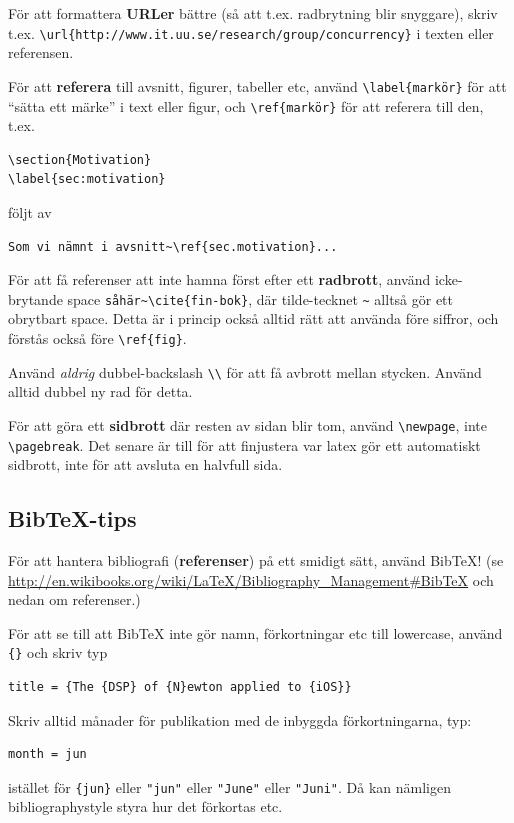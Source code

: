 \documentclass[a4paper,12pt]{article}
\begin{document}
För att formattera \textbf{URLer} bättre (så att t.ex. radbrytning blir snyggare), skriv t.ex. \verb|\url{http://www.it.uu.se/research/group/concurrency}| i texten eller referensen.

För att \textbf{referera} till avsnitt, figurer, tabeller etc, använd \verb|\label{markör}| för att ``sätta ett märke'' i text eller figur, och \verb|\ref{markör}| för att referera till den, t.ex.
\begin{verbatim}
\section{Motivation}
\label{sec:motivation}
\end{verbatim}

följt av
\begin{verbatim}
Som vi nämnt i avsnitt~\ref{sec.motivation}...
\end{verbatim}

För att få referenser att inte hamna först efter ett \textbf{radbrott}, använd icke-brytande space \verb|såhär~\cite{fin-bok}|, där tilde-tecknet \verb|~| alltså gör ett obrytbart space. Detta är i princip också alltid rätt att använda före siffror, och förstås också före \verb|\ref{fig}|.

Använd \emph{aldrig} dubbel-backslash \verb|\\| för att få avbrott mellan stycken. Använd alltid dubbel ny rad för detta.

För att göra ett \textbf{sidbrott} där resten av sidan blir tom, använd \verb|\newpage|, inte \verb|\pagebreak|. Det senare är till för att finjustera var latex gör ett automatiskt sidbrott, inte för att avsluta en halvfull sida.

\subsection{Bib\TeX-tips}

För att hantera bibliografi (\textbf{referenser}) på ett smidigt sätt, använd BibTeX! (se \url{http://en.wikibooks.org/wiki/LaTeX/Bibliography_Management#BibTeX} och nedan om referenser.)

För att se till att BibTeX inte gör namn, förkortningar etc till lowercase, använd \verb|{}| och skriv typ
\begin{verbatim}
title = {The {DSP} of {N}ewton applied to {iOS}}
\end{verbatim}

Skriv alltid månader för publikation med de inbyggda förkortningarna, typ:
\begin{verbatim}
month = jun
\end{verbatim}
istället för \verb|{jun}| eller \verb|"jun"| eller \verb|"June"| eller \verb|"Juni"|. Då kan nämligen bibliographystyle styra hur det förkortas etc.
\end{document}
